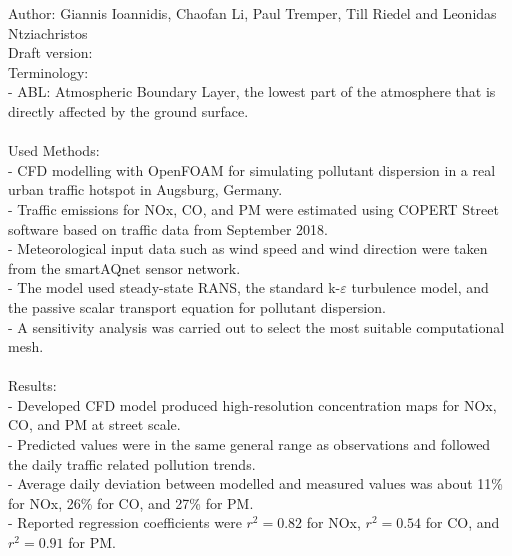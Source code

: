 \documentclass[12pt,a4paper]{article}
\begin{document}
Author: Giannis Ioannidis, Chaofan Li, Paul Tremper, Till Riedel and Leonidas Ntziachristos \\

Draft version:\\

Terminology: \\
- ABL: Atmospheric Boundary Layer, the lowest part of the atmosphere that is directly affected by the ground surface. \\
\\

Used Methods: \\
- CFD modelling with OpenFOAM for simulating pollutant dispersion in a real urban traffic hotspot in Augsburg, Germany. \\
- Traffic emissions for NOx, CO, and PM were estimated using COPERT Street software based on traffic data from September 2018. \\
- Meteorological input data such as wind speed and wind direction were taken from the smartAQnet sensor network. \\
- The model used steady-state RANS, the standard k-$\varepsilon$ turbulence model, and the passive scalar transport equation for pollutant dispersion. \\
- A sensitivity analysis was carried out to select the most suitable computational mesh. \\
\\

Results: \\
- Developed CFD model produced high-resolution concentration maps for NOx, CO, and PM at street scale. \\
- Predicted values were in the same general range as observations and followed the daily traffic related pollution trends. \\
- Average daily deviation between modelled and measured values was about 11\% for NOx, 26\% for CO, and 27\% for PM. \\
- Reported regression coefficients were $r^2 = 0.82$ for NOx, $r^2 = 0.54$ for CO, and $r^2 = 0.91$ for PM. \\
\\
\end{document}
